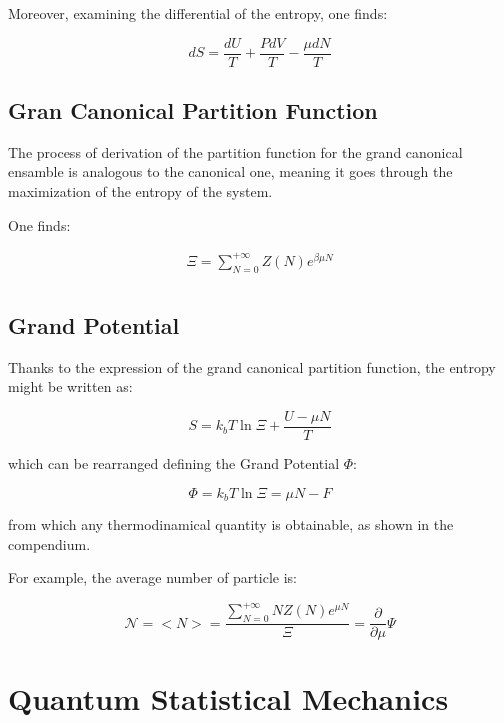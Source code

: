 \documentclass{article}
\begin{document}
Moreover, examining the differential of the entropy, one finds:

\begin{equation}
    dS=\frac{dU}{T}+\frac{PdV}{T}-\frac{\mu dN}{T}
\end{equation}


\subsection{Gran Canonical Partition Function}

The process of derivation of the partition function for the grand canonical ensamble is analogous to the canonical one,
meaning it goes through the maximization of the entropy of the system.

One finds:

\begin{equation}
    \begin{aligned}
        \Xi= \sum_{N=0}^{+\infty}Z(N)e^{\beta\mu N} \\
    \end{aligned}
\end{equation}

\subsection{Grand Potential}

Thanks to the expression of the grand canonical partition function, the
entropy might be written as:

\begin{equation}
    S= k_bT\ln{\Xi}+\frac{U-\mu N}{T}
\end{equation}

which can be rearranged defining the Grand Potential $\Phi$:

\begin{equation}
    \Phi=k_bT\ln{\Xi}=\mu N-F
\end{equation}

from which any thermodinamical quantity is obtainable, as shown in the compendium.

For example, the average number of particle is:

\begin{equation}
    \mathcal{N}=<N>=\frac{\sum_{N=0}^{+\infty} N Z(N)e^{\mu N}}{\Xi}= \frac{\partial}{\partial \mu}\Psi
\end{equation}


\section{Quantum Statistical Mechanics}
\end{document}
